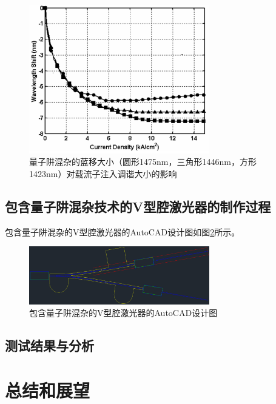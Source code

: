 \documentclass{ZJUthesis}
\begin{document}
\begin{figure}[!htb]
    \centering
    \includegraphics[width=0.7\textwidth]{./Pictures/qwi_tuning.eps}
    \caption{量子阱混杂的蓝移大小（圆形1475nm，三角形1446nm，方形1423nm）对载流子注入调谐大小的影响}
    \label{fig_qwi_tuning}
\end{figure}


\section{包含量子阱混杂技术的V型腔激光器的制作过程}

包含量子阱混杂的V型腔激光器的AutoCAD设计图如图\ref{fig_vccl_design}所示。

\begin{figure}[!htb]
    \centering
    \includegraphics[width=0.7\textwidth]{./Pictures/vccl_design.eps}
    \caption{包含量子阱混杂的V型腔激光器的AutoCAD设计图}
    \label{fig_vccl_design}
\end{figure}


\section{测试结果与分析}

\chapter{总结和展望}
\end{document}
